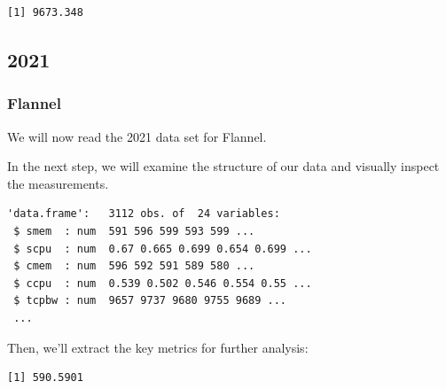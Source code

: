 \begin{verbatim}
[1] 9673.348
\end{verbatim}

\subsection{2021}

\subsubsection{Flannel}

We will now read the 2021 data set for Flannel.

\begin{Shaded}
\begin{Highlighting}[]
\OtherTok{\textless{}{-}} 
\OtherTok{\textless{}{-}} \NormalTok{(}\NormalTok{,}\NormalTok{))}
\end{Highlighting}
\end{Shaded}

In the next step, we will examine the structure of our data and visually
inspect the measurements.

\begin{Shaded}
\begin{Highlighting}[]
\end{Highlighting}
\end{Shaded}

\begin{verbatim}
'data.frame':   3112 obs. of  24 variables:
 $ smem  : num  591 596 599 593 599 ...
 $ scpu  : num  0.67 0.665 0.699 0.654 0.699 ...
 $ cmem  : num  596 592 591 589 580 ...
 $ ccpu  : num  0.539 0.502 0.546 0.554 0.55 ...
 $ tcpbw : num  9657 9737 9680 9755 9689 ...
 ...
\end{verbatim}

Then, we'll extract the key metrics for further analysis:

\begin{Shaded}
\begin{Highlighting}[]
\SpecialCharTok{\$}
\end{Highlighting}
\end{Shaded}

\begin{verbatim}
[1] 590.5901
\end{verbatim}

